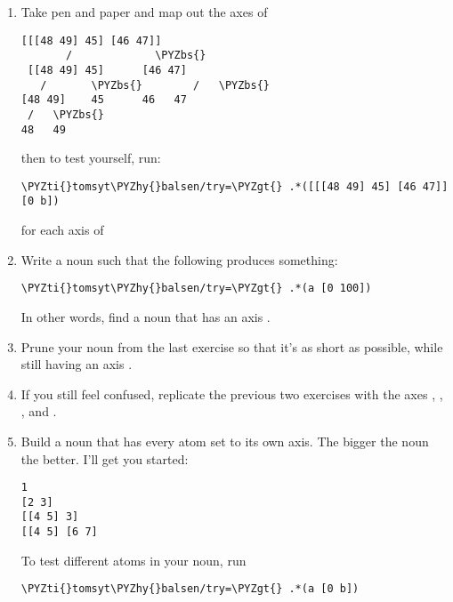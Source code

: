 \begin{enumerate}
\item Take pen and paper and map out the axes of
\begin{framed_shaded}
\begin{Verbatim}[fontsize=\relsize{-2.5},commandchars=\\\{\}]
   [[[48 49] 45] [46 47]]
       /             \PYZbs{}
 [[48 49] 45]      [46 47]
   /       \PYZbs{}        /   \PYZbs{}
[48 49]    45      46   47
 /   \PYZbs{}
48   49
\end{Verbatim}
\end{framed_shaded}
then to test yourself, run:
\begin{framed_shaded}
\begin{Verbatim}[fontsize=\relsize{-2.5},commandchars=\\\{\}]
\PYZti{}tomsyt\PYZhy{}balsen/try=\PYZgt{} .*([[[48 49] 45] [46 47]] [0 b])
\end{Verbatim}
\end{framed_shaded}
for each axis  of \kode{[[[48 49] 45] [46 47]]}
\item Write a noun  such that the following produces something:
\begin{framed_shaded}
\begin{Verbatim}[fontsize=\relsize{-2.5},commandchars=\\\{\}]
\PYZti{}tomsyt\PYZhy{}balsen/try=\PYZgt{} .*(a [0 100])
\end{Verbatim}
\end{framed_shaded}
In other words, find a noun that has an axis .
\item Prune your noun from the last exercise so that it's as short as possible,
while still having an axis .
\item If you still feel confused, replicate the previous two exercises with the
axes , , ,  and .
\item Build a noun that has every atom set to its own axis. The bigger the noun
the better. I'll get you started:
\begin{framed_shaded}
\begin{Verbatim}[fontsize=\relsize{-2.5},commandchars=\\\{\}]
1
[2 3]
[[4 5] 3]
[[4 5] [6 7]
\end{Verbatim}
\end{framed_shaded}
To test different atoms in your noun, run
\begin{framed_shaded}
\begin{Verbatim}[fontsize=\relsize{-2.5},commandchars=\\\{\}]
\PYZti{}tomsyt\PYZhy{}balsen/try=\PYZgt{} .*(a [0 b])
\end{Verbatim}
\end{framed_shaded}
\end{enumerate}

